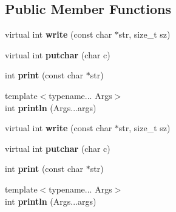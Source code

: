 \subsection*{Public Member Functions}
\begin{DoxyCompactItemize}
\item 
virtual int {\bfseries write} (const char $\ast$str, size\+\_\+t sz)\hypertarget{classgxx_1_1io_1_1strmout_abb1fc1d2780138a4d176ef25b1742b0d}{}\label{classgxx_1_1io_1_1strmout_abb1fc1d2780138a4d176ef25b1742b0d}

\item 
virtual int {\bfseries putchar} (char c)\hypertarget{classgxx_1_1io_1_1strmout_ac933aaaa835edf900a35d2affaeede7c}{}\label{classgxx_1_1io_1_1strmout_ac933aaaa835edf900a35d2affaeede7c}

\item 
int {\bfseries print} (const char $\ast$str)\hypertarget{classgxx_1_1io_1_1strmout_a2a57b1ead8397800021d17250b5022ca}{}\label{classgxx_1_1io_1_1strmout_a2a57b1ead8397800021d17250b5022ca}

\item 
{\footnotesize template$<$typename... Args$>$ }\\int {\bfseries println} (Args...\+args)\hypertarget{classgxx_1_1io_1_1strmout_a14338a75a3d625b1b548f03d93b0f5dd}{}\label{classgxx_1_1io_1_1strmout_a14338a75a3d625b1b548f03d93b0f5dd}

\item 
virtual int {\bfseries write} (const char $\ast$str, size\+\_\+t sz)\hypertarget{classgxx_1_1io_1_1strmout_abb1fc1d2780138a4d176ef25b1742b0d}{}\label{classgxx_1_1io_1_1strmout_abb1fc1d2780138a4d176ef25b1742b0d}

\item 
virtual int {\bfseries putchar} (char c)\hypertarget{classgxx_1_1io_1_1strmout_ac933aaaa835edf900a35d2affaeede7c}{}\label{classgxx_1_1io_1_1strmout_ac933aaaa835edf900a35d2affaeede7c}

\item 
int {\bfseries print} (const char $\ast$str)\hypertarget{classgxx_1_1io_1_1strmout_a2a57b1ead8397800021d17250b5022ca}{}\label{classgxx_1_1io_1_1strmout_a2a57b1ead8397800021d17250b5022ca}

\item 
{\footnotesize template$<$typename... Args$>$ }\\int {\bfseries println} (Args...\+args)\hypertarget{classgxx_1_1io_1_1strmout_a14338a75a3d625b1b548f03d93b0f5dd}{}\label{classgxx_1_1io_1_1strmout_a14338a75a3d625b1b548f03d93b0f5dd}


\end{DoxyCompactItemize}
